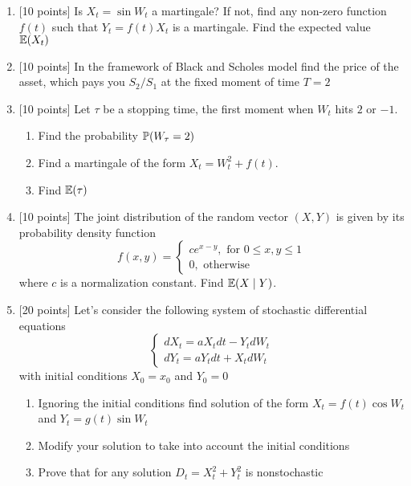 \documentclass[12pt, a4paper]{article}
\begin{document}
\begin{enumerate}

\item $[$10 points] Is $X_t=\sin W_t$ a martingale? If not, find any non-zero function $f(t)$ such that $Y_t=f(t)X_t$ is a martingale. Find the expected value $\E(X_t)$

\item  $[$10 points] In the framework of Black and Scholes model find the price of the asset, which pays you $S_2/S_1$ at the fixed moment of time $T=2$

\item $[$10 points] Let $\tau$ be a stopping time, the first moment when $W_t$ hits $2$ or $-1$.
\begin{enumerate}
\item Find the probability $\P( W_{\tau} = 2)$
\item Find a martingale of the form $X_t=W_t^2+f(t)$.
\item Find $\E(\tau)$
\end{enumerate}

\item $[$10 points]  The joint distribution of the random vector $(X,Y)$ is given by its probability density function
\[
f(x,y)=
\left\{
  \begin{array}{l}
    c e^{x-y}, \text{ for } 0\leq x,y\leq 1 \\
    0, \text{ otherwise}
  \end{array}
\right.
\]
where $c$ is a normalization constant. Find $\E(X\mid Y)$.

\item $[$20 points] Let’s consider the following system of stochastic differential equations
\[
\left\{
  \begin{array}{l}
    dX_t=aX_t dt-Y_t dW_t \\
    dY_t=aY_t dt+X_t dW_t
  \end{array}
\right.
\]
with initial conditions $X_0=x_0$ and $Y_0=0$
\begin{enumerate}
\item Ignoring the initial conditions find solution of the form $X_t=f(t)\cos W_t$ and $Y_t=g(t)\sin W_t$
\item Modify your solution to take into account the initial conditions
\item Prove that for any solution $D_t=X_t^2+Y_t^2$ is nonstochastic
\end{enumerate}

\end{enumerate}
\end{document}
